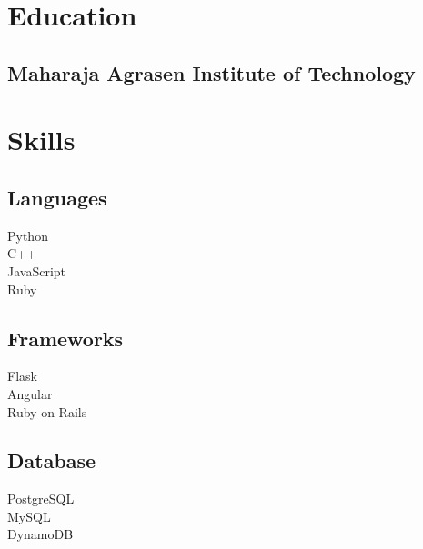 \documentclass[]{deedy-resume-reversed}
\begin{document}
\begin{minipage}[t]{0.33\textwidth}


\section{Education}

\subsection{Maharaja Agrasen Institute of Technology}
\sectionsep


\section{Skills}
\subsection{Languages}
\textbullet{} Python \\ 
\textbullet{} C++ \\
\textbullet{} JavaScript \\
\textbullet{} Ruby \\
\sectionsep

\subsection{Frameworks}
\textbullet{} Flask \\
\textbullet{} Angular \\
\textbullet{} Ruby on Rails \\
\sectionsep

\subsection{Database}
\textbullet{} PostgreSQL \\
\textbullet{} MySQL \\
\textbullet{} DynamoDB \\
\sectionsep


\end{minipage}
\end{document}
